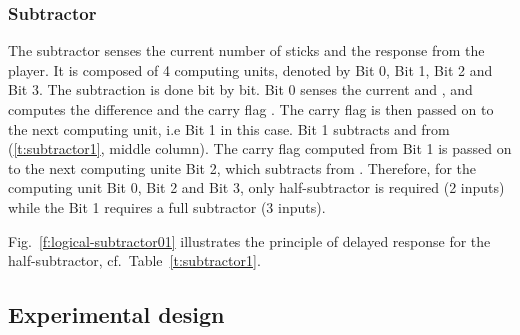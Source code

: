 \documentclass[12pt,notitlepage]{article}
\begin{document}



\subsubsection*{Subtractor} \label{ss:sub}

The subtractor senses the current number of sticks and the response from the player. It is composed of 4 computing units, denoted by Bit 0, Bit 1, Bit 2 and Bit 3. The subtraction is done bit by bit. Bit 0 senses the current  and , and computes the difference   and the carry flag . The carry flag is then passed on to the next computing unit, i.e Bit 1 in this case. Bit 1 subtracts  and  from  (\ref{t:subtractor1}, middle column). The carry flag  computed from Bit 1 is passed on to the next computing unite Bit 2, which subtracts  from . Therefore, for the computing unit Bit 0, Bit 2 and Bit 3, only half-subtractor is required (2 inputs) while the Bit 1 requires a full subtractor (3 inputs).




%
Fig.~\ref{f:logical-subtractor01}
illustrates the principle of delayed response
for the half-subtractor,
cf.~Table~\ref{t:subtractor1}.








\subsection{Experimental design} \label{ss:experiment}
\end{document}
